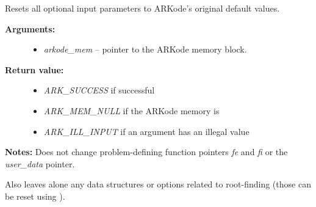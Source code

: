 \documentclass[letterpaper,10pt,english]{sphinxmanual}
\begin{document}

\begin{fulllineitems}
\label{c_interface/User_callable:c.ARKodeSetDefaults}
Resets all optional input parameters to ARKode's original
default values.
\begin{description}
\item[{\textbf{Arguments:}}] \leavevmode\begin{itemize}
\item {} 
\emph{arkode\_mem} -- pointer to the ARKode memory block.

\end{itemize}

\item[{\textbf{Return value:}}] \leavevmode\begin{itemize}
\item {} 
\emph{ARK\_SUCCESS} if successful

\item {} 
\emph{ARK\_MEM\_NULL} if the ARKode memory is 

\item {} 
\emph{ARK\_ILL\_INPUT} if an argument has an illegal value

\end{itemize}

\end{description}

\textbf{Notes:} Does not change problem-defining function pointers \emph{fe}
and \emph{fi} or the \emph{user\_data} pointer.

Also leaves alone any data structures or options related to
root-finding (those can be reset using {\hyperref[c_interface/User_callable:c.ARKodeRootInit]{\emph{}}}).

\end{fulllineitems}

\end{document}
